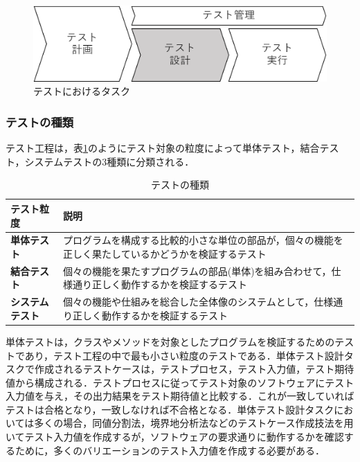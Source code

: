 \documentclass[12pt]{jarticle} %
\begin{document}
\begin{figure}[htbp]
\begin{center}
\includegraphics[clip,width=12cm]{test-task.pdf}
\caption{テストにおけるタスク}
\label{testtask}
\end{center}
\end{figure}

\subsubsection{テストの種類}

テスト工程は，表\ref{test-variety}のようにテスト対象の粒度によって単体テスト，結合テスト，システムテストの3種類に分類される．

\begin{table}[t]
\caption{テストの種類}
\label{test-variety}
\begin{tabular}{|l|p{11cm}|}
\hline
\textbf{テスト粒度} & \textbf{説明} \\ \hline
\textbf{単体テスト} & プログラムを構成する比較的小さな単位の部品が，個々の機能を正しく果たしているかどうかを検証するテスト \\ \hline
\textbf{結合テスト} & 個々の機能を果たすプログラムの部品(単体)を組み合わせて，仕様通り正しく動作するかを検証するテスト\\ \hline
\textbf{システムテスト} & 個々の機能や仕組みを総合した全体像のシステムとして，仕様通り正しく動作するかを検証するテスト \\ \hline
\end{tabular}
\end{table}

単体テストは，クラスやメソッドを対象としたプログラムを検証するためのテストであり，テスト工程の中で最も小さい粒度のテストである．単体テスト設計タスクで作成されるテストケースは，テストプロセス，テスト入力値，テスト期待値から構成される．テストプロセスに従ってテスト対象のソフトウェアにテスト入力値を与え，その出力結果をテスト期待値と比較する．これが一致していればテストは合格となり，一致しなければ不合格となる．単体テスト設計タスクにおいては多くの場合，同値分割法，境界地分析法などのテストケース作成技法を用いてテスト入力値を作成するが，ソフトウェアの要求通りに動作するかを確認するために，多くのバリエーションのテスト入力値を作成する必要がある．
\end{document}
